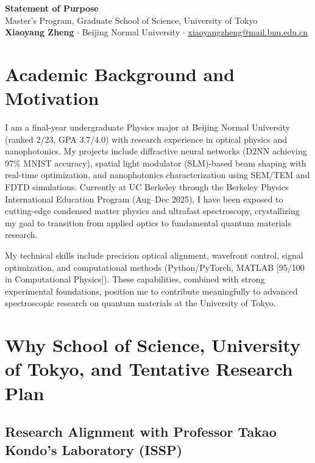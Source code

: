 \documentclass[11pt,a4paper]{article}
\begin{document}
\begin{center}
    {\large \textbf{Statement of Purpose}}\\[0.2em]
    {\normalsize Master's Program, Graduate School of Science, University of Tokyo}\\[0.5em]
    \textbf{Xiaoyang Zheng} $\cdot$ Beijing Normal University $\cdot$ \href{mailto:xiaoyangzheng@mail.bnu.edu.cn}{xiaoyangzheng@mail.bnu.edu.cn}
\end{center}

\vspace{-0.4em}

\section{Academic Background and Motivation}

I am a final-year undergraduate Physics major at Beijing Normal University (ranked 2/23, GPA 3.7/4.0) with research experience in optical physics and nanophotonics. My projects include diffractive neural networks (D2NN achieving 97\% MNIST accuracy), spatial light modulator (SLM)-based beam shaping with real-time optimization, and nanophotonics characterization using SEM/TEM and FDTD simulations. Currently at UC Berkeley through the Berkeley Physics International Education Program (Aug--Dec 2025), I have been exposed to cutting-edge condensed matter physics and ultrafast spectroscopy, crystallizing my goal to transition from applied optics to fundamental quantum materials research.

My technical skills include precision optical alignment, wavefront control, signal optimization, and computational methods (Python/PyTorch, MATLAB [95/100 in Computational Physics]). These capabilities, combined with strong experimental foundations, position me to contribute meaningfully to advanced spectroscopic research on quantum materials at the University of Tokyo.

\section{Why School of Science, University of Tokyo, and Tentative Research Plan}

\subsection{Research Alignment with Professor Takao Kondo's Laboratory (ISSP)}
\end{document}
